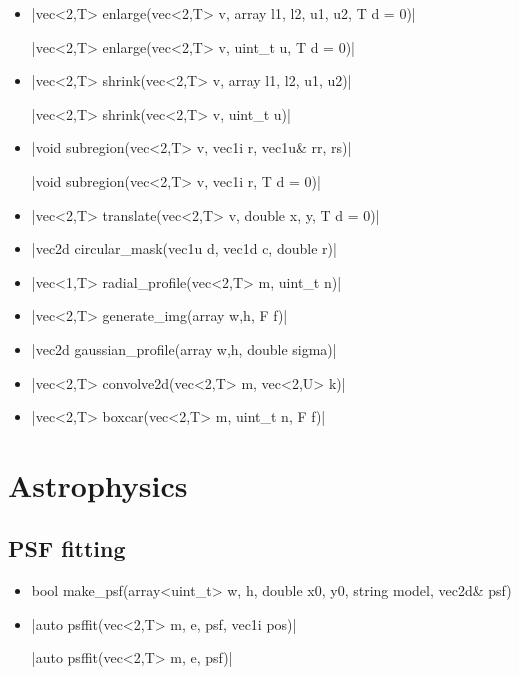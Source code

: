 \documentclass[12pt]{report}
\begin{document}
\begin{itemize}
\item \cppinline|vec<2,T> enlarge(vec<2,T> v, array {l1, l2, u1, u2}, T d = 0)| 

\cppinline|vec<2,T> enlarge(vec<2,T> v, uint_t u, T d = 0)|

\item \cppinline|vec<2,T> shrink(vec<2,T> v, array {l1, l2, u1, u2})| 

\cppinline|vec<2,T> shrink(vec<2,T> v, uint_t u)|

\item \cppinline|void subregion(vec<2,T> v, vec1i r, vec1u& rr, rs)| 

\cppinline|void subregion(vec<2,T> v, vec1i r, T d = 0)|

\item \cppinline|vec<2,T> translate(vec<2,T> v, double x, y, T d = 0)| 

\item \cppinline|vec2d circular_mask(vec1u d, vec1d c, double r)| 

\item \cppinline|vec<1,T> radial_profile(vec<2,T> m, uint_t n)| 

\item \cppinline|vec<2,T> generate_img(array {w,h}, F f)| 

\item \cppinline|vec2d gaussian_profile(array {w,h}, double sigma)| 

\item \cppinline|vec<2,T> convolve2d(vec<2,T> m, vec<2,U> k)| 

\item \cppinline|vec<2,T> boxcar(vec<2,T> m, uint_t n, F f)| 
\end{itemize}

\section{Astrophysics \label{SEC:support:astro}}

\subsection{PSF fitting}

\begin{itemize}
\item {}\begin{cppcode}
bool make_psf(array<uint_t> {w, h}, double x0, y0,
              string model, vec2d& psf)
\end{cppcode}

\item \cppinline|auto psffit(vec<2,T> m, e, psf, vec1i pos)| 

\cppinline|auto psffit(vec<2,T> m, e, psf)|
\end{itemize}
\end{document}
